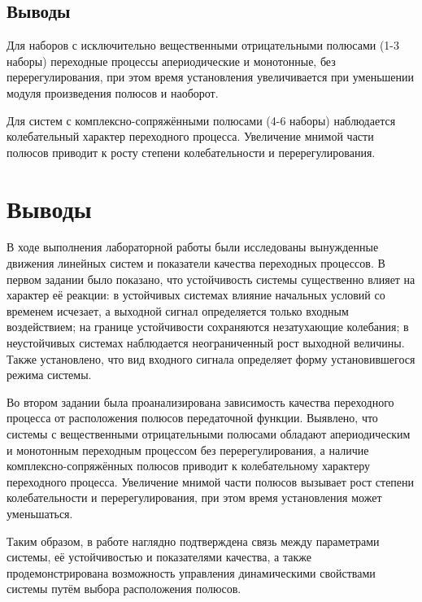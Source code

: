 \documentclass[a5paper, 10pt]{article}
\theoremstyle{definition}
\theoremstyle{plain}
\theoremstyle{remark}
\begin{document}
\subsection{Выводы}

Для наборов с исключительно вещественными отрицательными полюсами (1-3 наборы) переходные процессы апериодические и монотонные, без перерегулирования, при этом время установления увеличивается при уменьшении модуля произведения полюсов и наоборот.

Для систем с комплексно-сопряжёнными полюсами (4-6 наборы) наблюдается колебательный характер переходного процесса. Увеличение мнимой части полюсов приводит к росту степени колебательности и перерегулирования.

\section{Выводы}
В ходе выполнения лабораторной работы были исследованы вынужденные движения линейных систем и показатели качества переходных процессов. В первом задании было показано, что устойчивость системы существенно влияет на характер её реакции: в устойчивых системах влияние начальных условий со временем исчезает, а выходной сигнал определяется только входным воздействием; на границе устойчивости сохраняются незатухающие колебания; в неустойчивых системах наблюдается неограниченный рост выходной величины. Также установлено, что вид входного сигнала определяет форму установившегося режима системы.

Во втором задании была проанализирована зависимость качества переходного процесса от расположения полюсов передаточной функции. Выявлено, что системы с вещественными отрицательными полюсами обладают апериодическим и монотонным переходным процессом без перерегулирования, а наличие комплексно-сопряжённых полюсов приводит к колебательному характеру переходного процесса. Увеличение мнимой части полюсов вызывает рост степени колебательности и перерегулирования, при этом время установления может уменьшаться.

Таким образом, в работе наглядно подтверждена связь между параметрами системы, её устойчивостью и показателями качества, а также продемонстрирована возможность управления динамическими свойствами системы путём выбора расположения полюсов.
\end{document}
